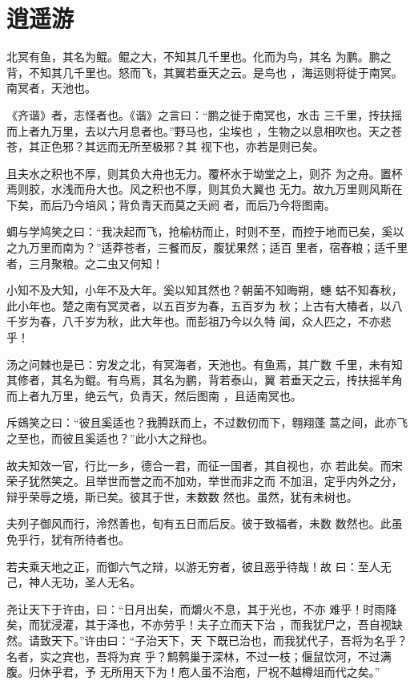 \documentclass[a4paper,12pt,UTF8,twoside]{ctexbook}
\begin{document}
\section{逍遥游}

北冥有鱼，其名为鲲。鲲之大，不知其几千里也。化而为鸟，其名 为鹏。鹏之背，不知其几千里也。怒而飞，其翼若垂天之云。是鸟也 ，海运则将徙于南冥。南冥者，天池也。

《齐谐》者，志怪者也。《谐》之言曰：“鹏之徙于南冥也，水击 三千里，抟扶摇而上者九万里，去以六月息者也。”野马也，尘埃也 ，生物之以息相吹也。天之苍苍，其正色邪？其远而无所至极邪？其 视下也，亦若是则已矣。

且夫水之积也不厚，则其负大舟也无力。覆杯水于坳堂之上，则芥 为之舟。置杯焉则胶，水浅而舟大也。风之积也不厚，则其负大翼也 无力。故九万里则风斯在下矣，而后乃今培风；背负青天而莫之夭阏 者，而后乃今将图南。

蜩与学鸠笑之曰：“我决起而飞，抢榆枋而止，时则不至，而控于地而已矣，奚以之九万里而南为？”适莽苍者，三餐而反，腹犹果然；适百 里者，宿舂粮；适千里者，三月聚粮。之二虫又何知！

小知不及大知，小年不及大年。奚以知其然也？朝菌不知晦朔，蟪 蛄不知春秋，此小年也。楚之南有冥灵者，以五百岁为春，五百岁为 秋；上古有大椿者，以八千岁为春，八千岁为秋，此大年也。而彭祖乃今以久特 闻，众人匹之，不亦悲乎！

汤之问棘也是已：穷发之北，有冥海者，天池也。有鱼焉，其广数 千里，未有知其修者，其名为鲲。有鸟焉，其名为鹏，背若泰山，翼 若垂天之云，抟扶摇羊角而上者九万里，绝云气，负青天，然后图南 ，且适南冥也。

斥鴳笑之曰：“彼且奚适也？我腾跃而上，不过数仞而下，翱翔蓬 蒿之间，此亦飞之至也，而彼且奚适也？”此小大之辩也。

故夫知效一官，行比一乡，德合一君，而征一国者，其自视也，亦 若此矣。而宋荣子犹然笑之。且举世而誉之而不加劝，举世而非之而 不加沮，定乎内外之分，辩乎荣辱之境，斯已矣。彼其于世，未数数 然也。虽然，犹有未树也。

夫列子御风而行，泠然善也，旬有五日而后反。彼于致福者，未数 数然也。此虽免乎行，犹有所待者也。

若夫乘天地之正，而御六气之辩，以游无穷者，彼且恶乎待哉！故 曰：至人无己，神人无功，圣人无名。

尧让天下于许由，曰：“日月出矣，而爝火不息，其于光也，不亦 难乎！时雨降矣，而犹浸灌，其于泽也，不亦劳乎！夫子立而天下治 ，而我犹尸之，吾自视缺然。请致天下。”许由曰：“子治天下，天 下既已治也，而我犹代子，吾将为名乎？名者，实之宾也，吾将为宾 乎？鹪鹩巢于深林，不过一枝；偃鼠饮河，不过满腹。归休乎君，予 无所用天下为！庖人虽不治庖，尸祝不越樽俎而代之矣。”
\end{document}
